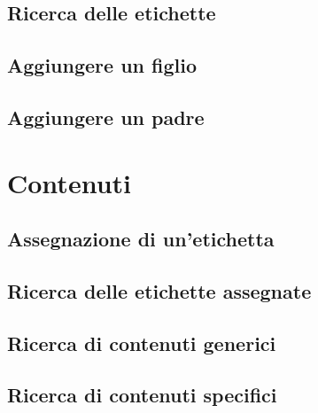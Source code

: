 \documentclass[10pt,a4paper,headinclude,footinclude,hidelinks]{scrreprt} %
\begin{document}
	\subsection{Ricerca delle etichette}
	\subsection{Aggiungere un figlio}
	\subsection{Aggiungere un padre}

	\section{Contenuti}
	\subsection{Assegnazione di un'etichetta}
	\subsection{Ricerca delle etichette assegnate}
	\subsection{Ricerca di contenuti generici}
	\subsection{Ricerca di contenuti specifici}
\end{document}
